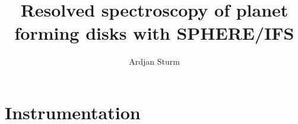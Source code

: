 \documentclass[twoside,single]{lion-msc}
\title{Resolved spectroscopy of planet forming disks with SPHERE/IFS}
\author{Ardjan Sturm}
\affiliation{Huygens-Kamerlingh Onnes Laboratory, Leiden University}   %
\begin{document}

\maketitle

\tableofcontents
\cleardoublepage




\chapter{Instrumentation}
\end{document}
